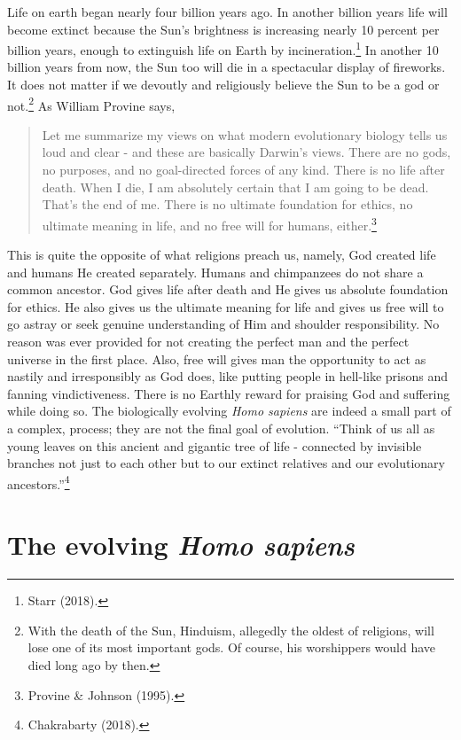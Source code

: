\begin{multicols}{2}
Life on earth began nearly four billion years ago. In another billion years life will become extinct because the Sun's brightness is increasing nearly 10 percent per billion years, enough to extinguish life on Earth by incineration.\footnote{Starr (2018).} In another 10 billion years from now, the Sun too will die in a spectacular display of fireworks. It does not matter if we devoutly and religiously believe the Sun to be a god or not.\footnote{With the death of the Sun, Hinduism, allegedly the oldest of religions, will lose one of its most important gods. Of course, his worshippers would have died long ago by then.} As William Provine says,
\begin{quote}
Let me summarize my views on what modern evolutionary biology tells us loud and clear - and these are basically Darwin's views. There are no gods, no purposes, and no goal-directed forces of any kind. There is no life after death. When I die, I am absolutely certain that I am going to be dead. That's the end of me. There is no ultimate foundation for ethics, no ultimate meaning in life, and no free will for humans, either.\footnote{Provine \& Johnson (1995).}
\end{quote}

This is quite the opposite of what religions preach us, namely, God created life and humans He created separately. Humans and chimpanzees do not share a common ancestor. God gives life after death and He gives us absolute foundation for ethics. He also gives us the ultimate meaning for life and gives us free will to go astray or seek genuine understanding of Him and shoulder responsibility. No reason was ever provided for not creating the perfect man and the perfect universe in the first place. Also, free will gives man the opportunity to act as nastily and irresponsibly as God does, like putting people in hell-like prisons and fanning vindictiveness. There is no Earthly reward for praising God and suffering while doing so. The biologically evolving \textit{Homo sapiens} are indeed a small part of a complex, process; they are not the final goal of evolution. “Think of us all as young leaves on this ancient and gigantic tree of life - connected by invisible branches not just to each other but to our extinct relatives and
our evolutionary ancestors.”\footnote{Chakrabarty (2018).}


\section{The evolving \textit{Homo sapiens}}


\end{multicols}
